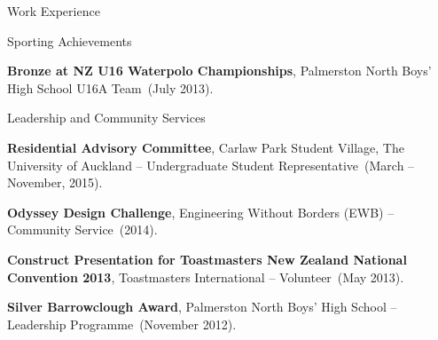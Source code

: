 \documentclass[11pt]{tracv}
\begin{document}
\begin{columnsection}{Work Experience}

	
\end{columnsection}

%
%

\pagebreak

\begin{hangingsection}{Sporting Achievements}

		\hangingentry \textbf{Bronze at NZ U16 Waterpolo Championships}, Palmerston North Boys' High School U16A Team~(July 2013).

\end{hangingsection}

\begin{hangingsection}{Leadership and Community Services}

    \hangingentry \textbf{Residential Advisory Committee}, Carlaw Park Student Village, The University of Auckland -- Undergraduate Student Representative~(March -- November, 2015).
    
    \hangingentry \textbf{Odyssey Design Challenge}, Engineering Without Borders (EWB) -- Community Service~(2014).
    
    \hangingentry \textbf{Construct Presentation for Toastmasters New Zealand National Convention 2013}, Toastmasters International -- Volunteer~(May 2013).
    
    \hangingentry \textbf{Silver Barrowclough Award}, Palmerston North Boys' High School -- Leadership Programme~(November 2012).

\end{hangingsection}
\end{document}
